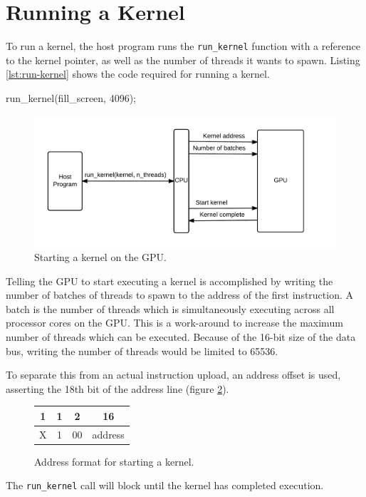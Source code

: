 \section{Running a Kernel}
To run a kernel, the host program runs the \verb/run_kernel/ function with a reference to the kernel pointer, as well as the number of threads it wants to spawn.
Listing \ref{lst:run-kernel} shows the code required for running a kernel.

\begin{c-code}[caption=Running a kernel, label=lst:run-kernel]
run_kernel(fill_screen, 4096);
\end{c-code}

\begin{figure}[H]
    \centering
    \includegraphics[width=\textwidth]{../cpu/diagrams/running_a_kernel.png}
    \caption{Starting a kernel on the GPU.}
    \label{fig:running_a_kernel}
\end{figure}

Telling the GPU to start executing a kernel is accomplished by writing the number of batches of threads to spawn to the address of the first instruction.
A batch is the number of threads which is simultaneously executing across all processor cores on the GPU.
This is a work-around to increase the maximum number of threads which can be executed.
Because of the 16-bit size of the data bus, writing the number of threads would be limited to 65536.

To separate this from an actual instruction upload, an address offset is used,
asserting the 18th bit of the address line (figure \ref{fig:start_kernel_format}).

\begin{figure}[H]
    \centering
    \begin{tabular}{|c|c|c|c|}
    \multicolumn{1}{c}{1} & \multicolumn{1}{c}{1} & \multicolumn{1}{c}{2} & \multicolumn{1}{c}{16} \\ \hline
    X & 1 & 00 & address \\ \hline
    \end{tabular}
    \caption{Address format for starting a kernel.}
    \label{fig:start_kernel_format}
\end{figure}

The \verb/run_kernel/ call will block until the kernel has completed execution.

